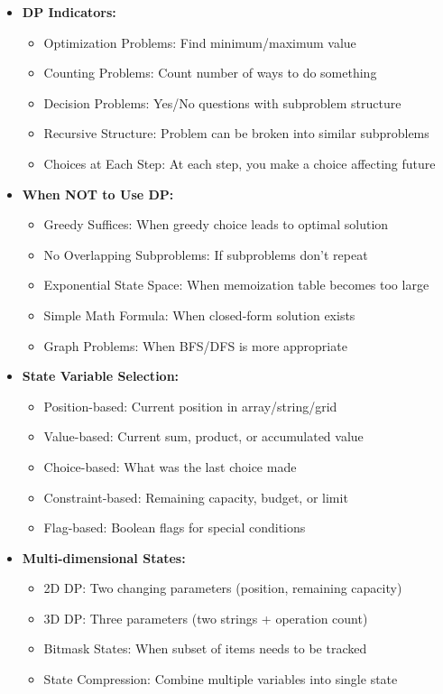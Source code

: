 \documentclass[a4paper,10pt]{book}
\begin{document}
\begin{itemize}[leftmargin=*]
    \item \textbf{DP Indicators:}
    \begin{itemize}
        \item Optimization Problems: Find minimum/maximum value
        \item Counting Problems: Count number of ways to do something
        \item Decision Problems: Yes/No questions with subproblem structure
        \item Recursive Structure: Problem can be broken into similar subproblems
        \item Choices at Each Step: At each step, you make a choice affecting future
    \end{itemize}

    \item \textbf{When NOT to Use DP:}
    \begin{itemize}
        \item Greedy Suffices: When greedy choice leads to optimal solution
        \item No Overlapping Subproblems: If subproblems don't repeat
        \item Exponential State Space: When memoization table becomes too large
        \item Simple Math Formula: When closed-form solution exists
        \item Graph Problems: When BFS/DFS is more appropriate
    \end{itemize}
\end{itemize}

\begin{itemize}[leftmargin=*]
    \item \textbf{State Variable Selection:}
    \begin{itemize}
        \item Position-based: Current position in array/string/grid
        \item Value-based: Current sum, product, or accumulated value
        \item Choice-based: What was the last choice made
        \item Constraint-based: Remaining capacity, budget, or limit
        \item Flag-based: Boolean flags for special conditions
    \end{itemize}

    \item \textbf{Multi-dimensional States:}
    \begin{itemize}
        \item 2D DP: Two changing parameters (position, remaining capacity)
        \item 3D DP: Three parameters (two strings + operation count)
        \item Bitmask States: When subset of items needs to be tracked
        \item State Compression: Combine multiple variables into single state
    \end{itemize}
\end{itemize}
\end{document}
